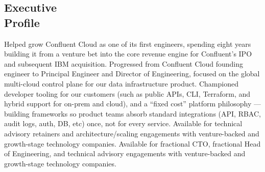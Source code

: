 \begin{resume}

\section{Executive \\ Profile}
Helped grow Confluent Cloud as one of its first engineers, spending eight years building it
from a venture bet into the core revenue engine for Confluent's IPO and subsequent IBM acquisition.
Progressed from Confluent Cloud founding engineer to Principal Engineer and Director of Engineering,
focused on the global multi-cloud control plane for our data infrastructure product. Championed
developer tooling for our customers (such as public APIs, CLI, Terraform, and hybrid support for on-prem and cloud),
and a ``fixed cost'' platform philosophy --- building frameworks so product teams absorb
standard integrations (API, RBAC, audit logs, auth, DB, etc) once, not for every service.
\ifAdvisorVariant
Available for technical advisory retainers and architecture/scaling engagements with venture-backed
and growth-stage technology companies.
\else
Available for fractional CTO, fractional Head of Engineering, and technical advisory engagements
with venture-backed and growth-stage technology companies.
\fi


\end{resume}
